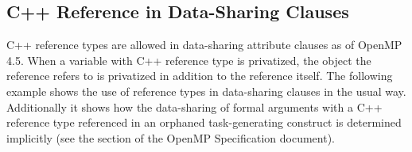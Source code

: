 \begin{cppspecific}[4ex]
\section{C++ Reference in Data-Sharing Clauses}
\label{sec:cpp_reference}

C++ reference types are allowed in data-sharing attribute clauses as of OpenMP 4.5.
When a variable with C++ reference type is privatized, the object the reference
refers to is privatized in addition to the reference itself. The following
example shows the use of reference types in data-sharing clauses in the
usual way. Additionally it shows how the data-sharing of formal arguments
with a C++ reference type referenced in an orphaned task-generating construct is
determined implicitly (see the  section of the OpenMP
Specification document).


\end{cppspecific}
